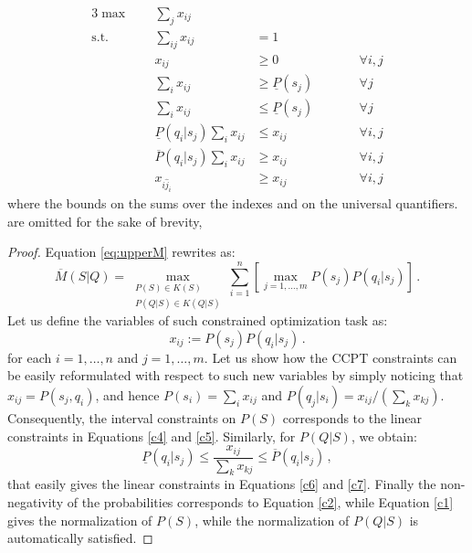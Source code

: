 \documentclass[runningheads]{llncs}
\begin{document}
\begin{theorem}
\begin{alignat}{3}
\max && \sum_j x_{ij}&&&\nonumber\\
\text{s.t.}\qquad&&\sum_{ij} x_{ij}&=1&& \label{c1}\\
&&x_{ij}&\geq 0&&\qquad \forall i,j \label{c2}\\
&&\sum_{i} x_{ij}&\geq \underline{P}(s_j)&&\qquad \forall j \label{c4}\\
&&\sum_{i} x_{ij}&\leq \underline{P}(s_j)&&\qquad \forall j \label{c5}\\
&&\underline{P}(q_i|s_j) \sum_{i} x_{ij}&\leq x_{ij}&&\qquad \forall i,j \label{c6}\\
&&\overline{P}(q_i|s_j) \sum_{i} x_{ij}&\geq x_{ij}&&\qquad \forall i,j
\label{c7}\\
&&x_{i\hat{j}_i}&\geq x_{ij}&&\qquad \forall i,j \label{c3}
\end{alignat}
where the bounds on the sums over the indexes and on the universal quantifiers.
are omitted for the sake of brevity, 
\begin{proof}
Equation \eqref{eq:upperM} rewrites as:
\begin{equation}\label{eq:firstopt}
\overline{M}(S|Q)
=\max_{\substack{P(S)\in K(S)\\P(Q|S)\in K(Q|S)}} \sum_{i=1}^n \left[ \max_{j=1,\ldots,m} P(s_j)P(q_i|s_j) \right]\,.
\end{equation}
Let us define the variables of such constrained optimization task as:
\begin{equation}
x_{ij}:=P(s_j)P(q_i|s_j)\,.
\end{equation}
for each $i=1,\ldots,n$ and $j=1,\ldots,m$. Let us show how the CCPT constraints can be easily reformulated with respect to such new variables by simply noticing that $x_{ij}=P(s_j,q_i)$, and hence $P(s_i)=\sum_i x_{ij}$ and $P(q_j|s_i)=x_{ij}/(\sum_{k} x_{kj})$. Consequently, the interval constraints on $P(S)$ corresponds to the linear constraints in Equations \eqref{c4} and \eqref{c5}. Similarly, for $P(Q|S)$, we obtain:
\begin{equation}\label{eq:fract}
\underline{P}(q_i|s_j) \leq \frac{x_{ij}}{\sum_k x_{kj}} \leq \overline{P}(q_i|s_j)\,,
\end{equation}
that easily gives the linear constraints in Equations \eqref{c6} and \eqref{c7}.
Finally the non-negativity of the probabilities corresponds to Equation \eqref{c2}, while Equation \eqref{c1} gives the normalization of $P(S)$, while the normalization of $P(Q|S)$ is automatically satisfied. 


\end{proof}
\end{theorem}
\end{document}
